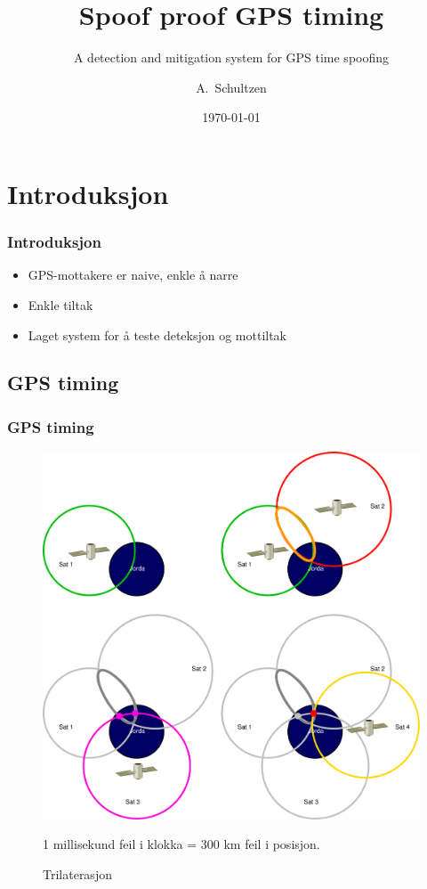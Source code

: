 \documentclass[xcolor=table]{beamer}
\title[Spoof proof GPS timing] %
{Spoof proof GPS timing}
\subtitle{A detection and mitigation system for GPS time spoofing}
\author[A. Schultzen] %
{A.~Schultzen\inst{1}}
\institute[Universities Here and There] %
{
  \inst{1}%
  Institutt for informatikk\\
  Universitetet i Oslo
}
\date{\today}
\begin{document}
\frame{\titlepage}

\section{Introduksjon}
\begin{frame}
  \frametitle{Introduksjon}
  \begin{itemize}
    \setlength\itemsep{2em}
    \item GPS-mottakere er naive, enkle å narre
    \item Enkle tiltak
    \item Laget system for å teste deteksjon og mottiltak
\end{itemize}
\end{frame}

\subsection{GPS timing}
\begin{frame}
\frametitle{GPS timing} 
  \begin{figure}
  \vspace{-30pt}
      \includegraphics[scale=0.15]{thesis/graphics/trilaterate.pdf}
      \caption{Trilaterasjon}
      1 millisekund feil i klokka = 300 km feil i posisjon.
    \end{figure}
\end{frame}
\end{document}
